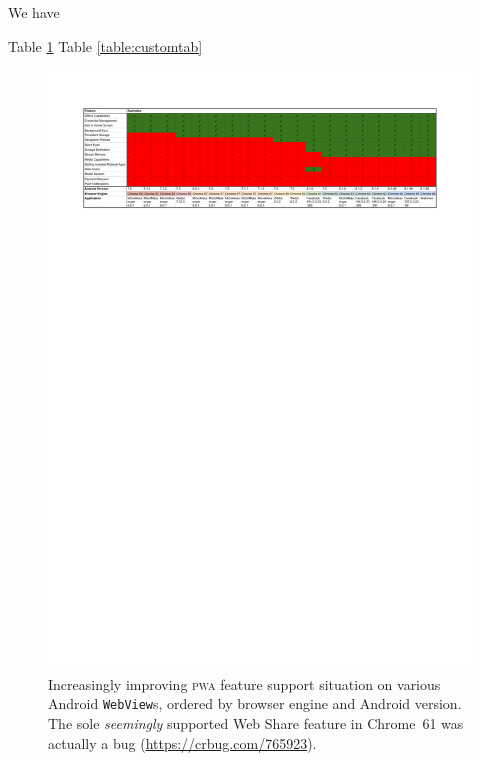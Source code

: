 \documentclass[sigconf]{acmart}
\begin{document}
We have 

Table \ref{table:webview}
Table \ref{table:customtab}

\begin{figure}[htb]
  \setcounter{figure}{0}
  \renewcommand{\figurename}{Table}
  \begin{center}
  \centerline{\includegraphics[trim=1.5cm 22.75cm 1.5cm 1.5cm, clip]{webview-results.pdf}}
  \caption{Increasingly improving \textsc{pwa} feature support situation
    on various Android \texttt{WebView}s, ordered by browser engine and Android version.
    The sole \emph{seemingly} supported Web Share feature in Chrome~61
    was actually a bug (\url{https://crbug.com/765923}).}
  \label{table:webview}
  \end{center}
\end{figure}
\end{document}
